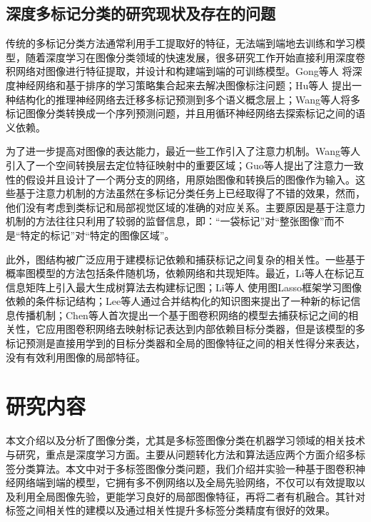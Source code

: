 \subsection{深度多标记分类的研究现状及存在的问题}

传统的多标记分类方法通常利用手工提取好的特征，无法端到端地去训练和学习模型，随着深度学习在图像分类领域的快速发展，很多研究工作开始直接利用深度卷积网络对图像进行特征提取，并设计和构建端到端的可训练模型。Gong等人\cite{Gong2014Deep} 将深度神经网络和基于排序的学习策略集合起来去解决图像标注问题；Hu等人\cite{Hu2016Learning} 提出一种结构化的推理神经网络去迁移多标记预测到多个语义概念层上；Wang等人\cite{Jiang2016CNN}将多标记图像分类转换成一个序列预测问题，并且用循环神经网络去探索标记之间的语义依赖。

为了进一步提高对图像的表达能力，最近一些工作引入了注意力机制。Wang等人引入了一个空间转换层去定位特征映射中的重要区域；Guo等人提出了注意力一致性的假设并且设计了一个两分支的网络，用原始图像和转换后的图像作为输入。这些基于注意力机制的方法虽然在多标记分类任务上已经取得了不错的效果，然而，他们没有考虑到类标记和局部视觉区域的准确的对应关系。主要原因是基于注意力机制的方法往往只利用了较弱的监督信息，即：“一袋标记”对“整张图像”而不是“特定的标记”对“特定的图像区域”。

此外，图结构被广泛应用于建模标记依赖和捕获标记之间复杂的相关性。一些基于概率图模型的方法包括条件随机场\cite{Ghamrawi2005Collective}，依赖网络\cite{Guo2011Multi}和共现矩阵\cite{Xue2011Correlative}。最近，Li等人\cite{Li2014Multi}在标记互信息矩阵上引入最大生成树算法去构建标记图；Li等人 使用图Lasso框架学习图像依赖的条件标记结构；Lee等人通过合并结构化的知识图来提出了一种新的标记信息传播机制；Chen等人\cite{Chen2019Multi}首次提出一个基于图卷积网络的模型去捕获标记之间的相关性，它应用图卷积网络去映射标记表达到内部依赖目标分类器，但是该模型的多标记预测是直接用学到的目标分类器和全局的图像特征之间的相关性得分来表达，没有有效利用图像的局部特征。

\section{研究内容}
本文介绍以及分析了图像分类，尤其是多标签图像分类在机器学习领域的相关技术与研究，重点是深度学习方面。主要从问题转化方法和算法适应两个方面介绍多标签分类算法。本文中对于多标签图像分类问题，我们介绍并实验一种基于图卷积神经网络端到端的模型，它拥有多不例网络以及全局先验网络，不仅可以有效提取以及利用全局图像先验，更能学习良好的局部图像特征，再将二者有机融合。其针对标签之间相关性的建模以及通过相关性提升多标签分类精度有很好的效果。

